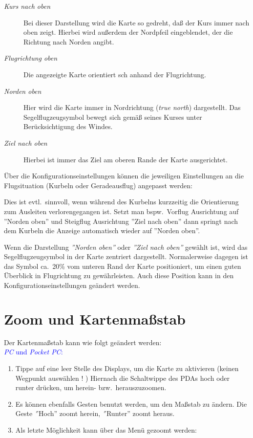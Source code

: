 \begin{description}
\item[\emph{Kurs nach oben}] Bei dieser Darstellung wird die Karte so gedreht, da\ss{} der Kurs immer nach oben zeigt. Hierbei wird außerdem der Nordpfeil eingeblendet, der die Richtung nach Norden angibt.
\item[\emph{Flugrichtung oben}] Die angezeigte Karte orientiert sch anhand der Flugrichtung.
\item[\emph{Norden oben}] Hier wird die Karte immer in Nordrichtung (\emph{true north}) dargestellt. Das Segelflugzeugsymbol bewegt sich gemäß seines Kurses unter Berücksichtigung des Windes.
\item[\emph{Ziel nach oben}] Hierbei ist immer das Ziel am oberen Rande der Karte ausgerichtet.
\end{description}

Über die Konfigurationseinstellungen können die jeweiligen Einstellungen an die Flugsituation (Kurbeln oder Geradeausflug) angepasst werden:

Dies ist evtl.\ sinnvoll, wenn während des Kurbelns kurzzeitig die Orientierung zum Ausleiten verlorengegangen ist. 
Setzt man bspw.\  \textsf{Vorflug Ausrichtung} auf ''Norden oben'' und \textsf{Steigflug Ausrichtung} ''Ziel nach oben''  dann 
springt nach dem Kurbeln die Anzeige automatisch wieder auf ''Norden oben''.

Wenn die Darstellung \emph{''Norden oben''} oder \emph{''Ziel nach oben''} gewählt ist, wird das Segelflugzeugsymbol in der Karte zentriert dargestellt. Normalerweise dagegen ist das Symbol ca.\ 20\% vom unteren Rand der Karte positioniert, um einen guten Überblick in Flugrichtung zu gewährleisten. Auch diese Position kann in den Konfigurationseinstellungen geändert werden.
\section{Zoom und Kartenmaßstab}\label{zoom}\label{kartenmasstab}
Der Kartenmaßstab kann wie folgt geändert werden: \\
\textcolor{blue}{\textsl{PC} und  \textsl{Pocket PC}:}
\begin{enumerate}
 \item Tippe auf eine leer Stelle des Displays, um die Karte zu aktivieren (keinen Wegpunkt auswählen ! ) 
        Hiernach die Schaltwippe des \textsf{PDA}s hoch oder runter drücken, um herein- bzw.\ herauszuzoomen. 
 \item Es können ebenfalls Gesten benutzt werden, um den Maßstab zu ändern.
      Die  Geste {\emph ''Hoch''} zoomt herein,  {\emph ''Runter''} zoomt heraus.
 \item Als letzte Möglichkeit kann über das Menü gezoomt werden:
\end{enumerate}


